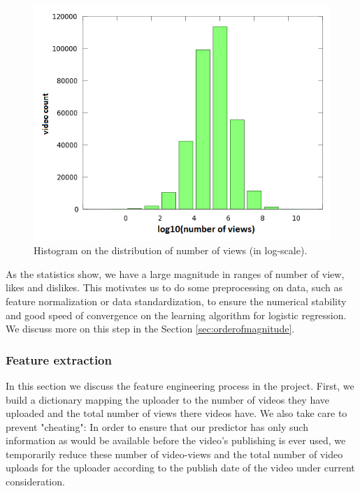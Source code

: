 		\begin{figure}[!h]
			\begin{center}
				\includegraphics[width=.5\textwidth,clip]{DistributionOfViews.png}
			\end{center}
			\caption{Histogram on the distribution of number of views (in log-scale).}
			\label{fig:logNoOfViews}
		\end{figure}
	
		As the statistics show, we have a large magnitude in ranges of number of view, likes and dislikes. This motivates us to do some preprocessing on data, such as feature normalization or data standardization, to ensure the numerical stability and good speed of convergence on the learning algorithm for logistic regression. We discuss more on this step in the Section \ref{sec:orderofmagnitude}.
						
	\subsubsection{Feature extraction}
		In this section we discuss the feature engineering process in the project. First, we build a dictionary mapping the uploader to the number of videos they have uploaded and the total number of views there videos have. We also take care to prevent "cheating":  In order to ensure that our predictor has only such information as would be available before the video's publishing is ever used, we temporarily reduce these number of video-views and the total number of video uploads for the uploader according to the publish date of the video under current consideration.

